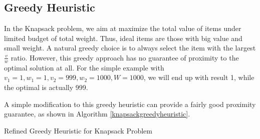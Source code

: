 \subsection{Greedy Heuristic}
In the Knapsack problem, we aim at maximize the total value of items under limited budget of total weight. Thus, ideal items are those with big value and small weight. A natural greedy choice is to always select the item with the largest $\frac{v}{w}$ ratio. However, this greedy approach has no guarantee of proximity to the optimal solution at all. For the simple example with $v_1=1,w_1=1,v_2=999,w_2=1000,W=1000$, we will end up with result 1, while the optimal is actually 999. 

A simple modification to this greedy heuristic can provide a fairly good proximity guarantee, as shown in Algorithm \ref{knapsackgreedyheuristic}.
\begin{algorithm}[ht]
\caption{Refined Greedy Heuristic for Knapsack Problem}\label{knapsackgreedyheuristic}
\begin{algorithmic}[1]
\Else{}
\EndIf
\end{algorithmic}
\end{algorithm}

